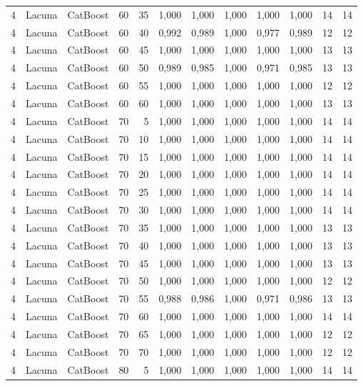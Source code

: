 \begin{longtable}{@{}rllrrrrrrrrr@{}}
4 & Lacuna & CatBoost & 60 & 35 & 1,000 & 1,000 & 1,000 & 1,000 & 1,000 & 14 & 14 \\
4 & Lacuna & CatBoost & 60 & 40 & 0,992 & 0,989 & 1,000 & 0,977 & 0,989 & 12 & 12 \\
4 & Lacuna & CatBoost & 60 & 45 & 1,000 & 1,000 & 1,000 & 1,000 & 1,000 & 13 & 13 \\
4 & Lacuna & CatBoost & 60 & 50 & 0,989 & 0,985 & 1,000 & 0,971 & 0,985 & 13 & 13 \\
4 & Lacuna & CatBoost & 60 & 55 & 1,000 & 1,000 & 1,000 & 1,000 & 1,000 & 12 & 12 \\
4 & Lacuna & CatBoost & 60 & 60 & 1,000 & 1,000 & 1,000 & 1,000 & 1,000 & 13 & 13 \\
4 & Lacuna & CatBoost & 70 & 5 & 1,000 & 1,000 & 1,000 & 1,000 & 1,000 & 14 & 14 \\
4 & Lacuna & CatBoost & 70 & 10 & 1,000 & 1,000 & 1,000 & 1,000 & 1,000 & 14 & 14 \\
4 & Lacuna & CatBoost & 70 & 15 & 1,000 & 1,000 & 1,000 & 1,000 & 1,000 & 14 & 14 \\
4 & Lacuna & CatBoost & 70 & 20 & 1,000 & 1,000 & 1,000 & 1,000 & 1,000 & 14 & 14 \\
4 & Lacuna & CatBoost & 70 & 25 & 1,000 & 1,000 & 1,000 & 1,000 & 1,000 & 14 & 14 \\
4 & Lacuna & CatBoost & 70 & 30 & 1,000 & 1,000 & 1,000 & 1,000 & 1,000 & 14 & 14 \\
4 & Lacuna & CatBoost & 70 & 35 & 1,000 & 1,000 & 1,000 & 1,000 & 1,000 & 13 & 13 \\
4 & Lacuna & CatBoost & 70 & 40 & 1,000 & 1,000 & 1,000 & 1,000 & 1,000 & 13 & 13 \\
4 & Lacuna & CatBoost & 70 & 45 & 1,000 & 1,000 & 1,000 & 1,000 & 1,000 & 13 & 13 \\
4 & Lacuna & CatBoost & 70 & 50 & 1,000 & 1,000 & 1,000 & 1,000 & 1,000 & 12 & 12 \\
4 & Lacuna & CatBoost & 70 & 55 & 0,988 & 0,986 & 1,000 & 0,971 & 0,986 & 13 & 13 \\
4 & Lacuna & CatBoost & 70 & 60 & 1,000 & 1,000 & 1,000 & 1,000 & 1,000 & 14 & 14 \\
4 & Lacuna & CatBoost & 70 & 65 & 1,000 & 1,000 & 1,000 & 1,000 & 1,000 & 12 & 12 \\
4 & Lacuna & CatBoost & 70 & 70 & 1,000 & 1,000 & 1,000 & 1,000 & 1,000 & 12 & 12 \\
4 & Lacuna & CatBoost & 80 & 5 & 1,000 & 1,000 & 1,000 & 1,000 & 1,000 & 14 & 14 \\

\end{longtable}
